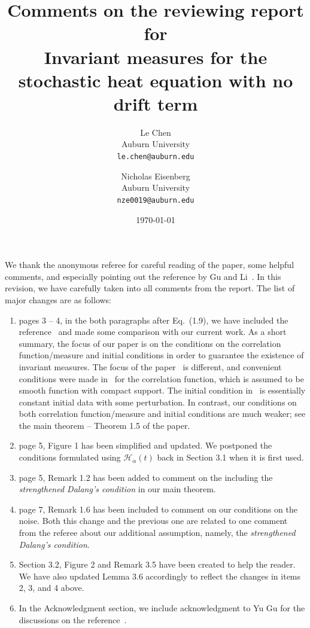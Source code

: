 \documentclass[a4paper,12pt]{article}%
\title{Comments on the reviewing report for\\
Invariant measures for the stochastic heat equation with no drift term}
\author{Le Chen\\Auburn University\\\texttt{le.chen@auburn.edu}\\
  \and
    Nicholas Eisenberg\\Auburn University\\\texttt{nze0019@auburn.edu}
  }
\date{\today}
\theoremstyle{plain}
\theoremstyle{definition}
\numberwithin{equation}{section}
\begin{document}
  \maketitle
 
  We thank the anonymous referee for careful reading of the paper, some helpful
  comments, and especially pointing out the reference by Gu and
  Li~\cite{gu.li:20:fluctuations}. In this revision, we have carefully taken
  into all comments from the report. The list of major changes are as follows:

	\begin{enumerate}
    \item pages 3 -- 4, in the both paragraphs after Eq.~(1.9), we have included
      the reference~\cite{gu.li:20:fluctuations} and made some comparison with
      our current work. As a short summary, the focus of our paper is on the
      conditions on the correlation function/measure and initial conditions in
      order to guarantee the existence of invariant measures. The focus of the
      paper~\cite{gu.li:20:fluctuations} is different, and convenient conditions
      were made in~\cite{gu.li:20:fluctuations} for the correlation function,
      which is assumed to be smooth function with compact support. The initial
      condition in~\cite{gu.li:20:fluctuations} is essentially constant initial
      data with some perturbation. In contrast, our conditions on both
      correlation function/measure and initial conditions are much weaker; see
      the main theorem -- Theorem 1.5 of the paper.
    \item page 5, Figure 1 has been simplified and updated. We postponed the
      conditions formulated using $\mathcal{H}_\alpha(t)$ back in Section 3.1
      when it is first used.
		\item page 5, Remark 1.2 has been added to comment on the including the
      \textit{strengthened Dalang's condition} in our main theorem.
		\item page 7, Remark 1.6 has been included to comment on our conditions on
      the noise. Both this change and the previous one are related to one
      comment from the referee about our additional assumption, namely, the
      \textit{strengthened Dalang's condition}.
		\item Section 3.2, Figure 2 and Remark 3.5 have been created to help the reader. 
      We have also updated Lemma 3.6 accordingly to reflect the changes in items
      2, 3, and 4 above.
    \item In the Acknowledgment section, we include acknowledgment to Yu Gu
      for the discussions on the reference~\cite{gu.li:20:fluctuations}.
	\end{enumerate}
\end{document}
